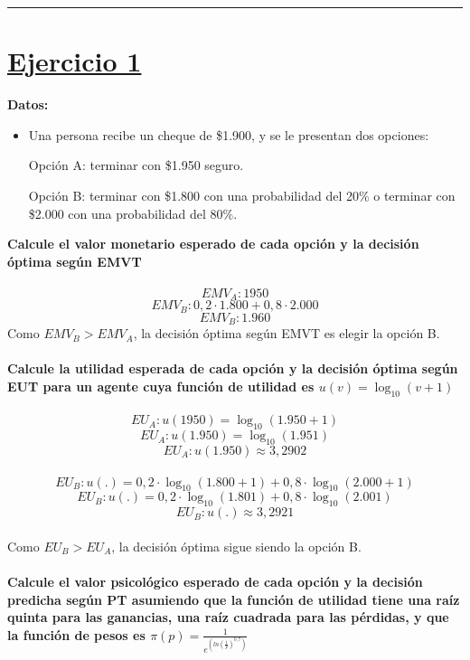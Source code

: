 \documentclass{article}
\newcommand*\sepline{%
  \begin{center}
    \rule[1ex]{.5\textwidth}{.5pt}
  \end{center}}
\begin{document}
\sepline

    \section*{\underline{Ejercicio 1}}
        \textbf{Datos:}
        \begin{itemize}
            \item Una persona recibe un cheque de \$1.900, y se le presentan dos opciones:
            
            Opción A: terminar con \$1.950 seguro.

            Opción B: terminar con \$1.800 con una probabilidad del 20\% o terminar con \$2.000 con una probabilidad del 80\%.
        \end{itemize}
        \textbf{Calcule el valor monetario esperado de cada opción y la decisión óptima según EMVT}
        \\
        \\
        \[EMV_{A}: 1950\]
        \[EMV_{B}: 0,2 \cdot 1.800 + 0,8 \cdot 2.000\]
        \[EMV_{B}: 1.960\]
        Como $EMV_{B} > EMV_{A}$, la decisión óptima según EMVT es elegir la opción B.
        \\
        \\
        \textbf{Calcule la utilidad esperada de cada opción y la decisión óptima según EUT para un agente cuya función de utilidad es \(u(v)=\log_{10} (v+1)\)}
        \\
        \\
        \[EU_{A}: u(1950) = \log_{10}(1.950 + 1)\]
        \[EU_{A}: u(1.950) = \log_{10}(1.951)\]
        \[EU_{A}: u(1.950) \approx 3,2902\]
        \\
        \[EU_{B}: u(.) = 0,2 \cdot \log_{10}(1.800 + 1) + 0,8 \cdot \log_{10}(2.000 + 1)\]
        \[EU_{B}: u(.) = 0,2 \cdot \log_{10}(1.801) + 0,8 \cdot \log_{10}(2.001)\]
        \[EU_{B}: u(.) \approx 3,2921\]
        \\
        Como \(EU_{B} > EU_{A}\), la decisión óptima sigue siendo la opción B.
        \\
        \\
        \textbf{Calcule el valor psicológico esperado de cada opción y la decisión predicha según PT asumiendo que la función de utilidad tiene una raíz quinta para las ganancias, una raíz cuadrada para las pérdidas, y que la función de pesos es \(\pi(p) = \frac{1}{e^{(ln(\frac{1}{p})^{0,7})}}\)}
        \\
        \\
\end{document}

